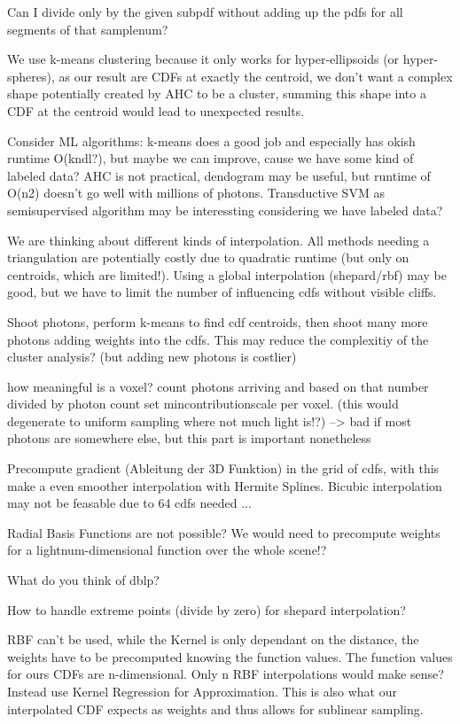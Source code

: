Can I divide only by the given subpdf without adding up the pdfs for all segments of that samplenum?

We use k-means clustering because it only works for hyper-ellipsoids (or hyper-spheres), as our result are CDFs at exactly the centroid, we don't want a complex shape potentially created by AHC to be a cluster, summing this shape into a CDF at the centroid would lead to unexpected results.

Consider ML algorithms: k-means does a good job and especially has okish runtime O(kndl?), but maybe we can improve, cause we have some kind of labeled data? AHC is not practical, dendogram may be useful, but runtime of O(n2) doesn't go well with millions of photons. Transductive SVM as semisupervised algorithm may be interessting considering we have labeled data? 

We are thinking about different kinds of interpolation. All methods needing a triangulation are potentially costly due to quadratic runtime (but only on centroids, which are limited!). Using a global interpolation (shepard/rbf) may be good, but we have to limit the number of influencing cdfs without visible cliffs.

Shoot photons, perform k-means to find cdf centroids, then shoot many more photons adding weights into the cdfs. This may reduce the complexitiy of the cluster analysis? (but adding new photons is costlier)

how meaningful is a voxel? count photons arriving and based on that number divided by photon count set mincontributionscale per voxel. (this would degenerate to uniform sampling where not much light is!?) --> bad if most photons are somewhere else, but this part is important nonetheless

Precompute gradient (Ableitung der 3D Funktion) in the grid of cdfs, with this make a even smoother interpolation with Hermite Splines. Bicubic interpolation may not be feasable due to 64 cdfs needed ...

Radial Basis Functions are not possible? We would need to precompute weights for a lightnum-dimensional function over the whole scene!?

What do you think of dblp?

How to handle extreme points (divide by zero) for shepard interpolation?

RBF can't be used, while the Kernel is only dependant on the distance, the weights have to be precomputed knowing the function values. The function values for ours CDFs are n-dimensional. Only n RBF interpolations would make sense? Instead use Kernel Regression for Approximation. This is also what our interpolated CDF expects as weights and thus allows for sublinear sampling.

